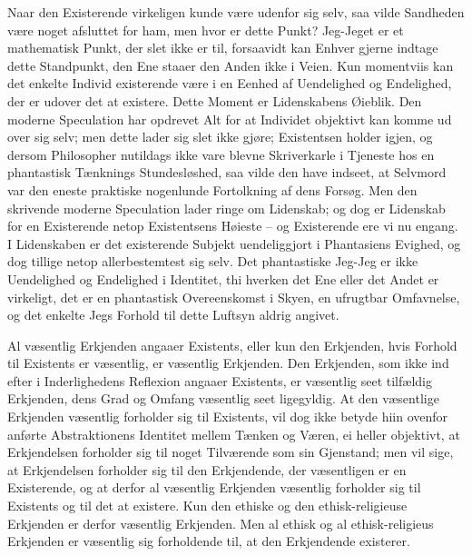 \documentclass[12pt,a4paper]{article}
\begin{document}
Naar den Existerende virkeligen kunde være udenfor sig selv, saa vilde Sandheden være noget afsluttet for ham, men hvor er dette Punkt? Jeg-Jeget er et mathematisk Punkt, der slet ikke er til, forsaavidt kan Enhver gjerne indtage dette Standpunkt, den Ene staaer den Anden ikke i Veien. Kun momentviis kan det enkelte Individ existerende være i en Eenhed af Uendelighed og Endelighed, der er udover det at existere. Dette Moment er Lidenskabens Øieblik. Den moderne Speculation har opdrevet Alt for at Individet objektivt kan komme ud over sig selv; men dette lader sig slet ikke gjøre; Existentsen holder igjen, og dersom Philosopher nutildags ikke vare blevne Skriverkarle i Tjeneste hos en phantastisk Tænknings Stundesløshed, saa vilde den have indseet, at Selvmord var den eneste praktiske nogenlunde Fortolkning af dens Forsøg. Men den skrivende moderne Speculation lader ringe om Lidenskab; og dog er Lidenskab for en Existerende netop Existentsens Høieste – og Existerende ere vi nu engang. I Lidenskaben er det existerende Subjekt uendeliggjort i Phantasiens Evighed, og dog tillige netop allerbestemtest sig selv. Det phantastiske Jeg-Jeg er ikke Uendelighed og Endelighed i Identitet, thi hverken det Ene eller det Andet er virkeligt, det er en phantastisk Overeenskomst i Skyen, en ufrugtbar Omfavnelse, og det enkelte Jegs Forhold til dette Luftsyn aldrig angivet.

Al væsentlig Erkjenden angaaer Existents, eller kun den Erkjenden, hvis Forhold til Existents er væsentlig, er væsentlig Erkjenden. Den Erkjenden, som ikke ind efter i Inderlighedens Reflexion angaaer Existents, er væsentlig seet tilfældig Erkjenden, dens Grad og Omfang væsentlig seet ligegyldig. At den væsentlige Erkjenden væsentlig forholder sig til Existents, vil dog ikke betyde hiin ovenfor anførte Abstraktionens Identitet mellem Tænken og Væren, ei heller objektivt, at Erkjendelsen forholder sig til noget Tilværende som sin Gjenstand; men vil sige, at Erkjendelsen forholder sig til den Erkjendende, der væsentligen er en Existerende, og at derfor al væsentlig Erkjenden væsentlig forholder sig til Existents og til det at existere. Kun den ethiske og den ethisk-religieuse Erkjenden er derfor væsentlig Erkjenden. Men al ethisk og al ethisk-religieus Erkjenden er væsentlig sig forholdende til, at den Erkjendende existerer.
\end{document}
